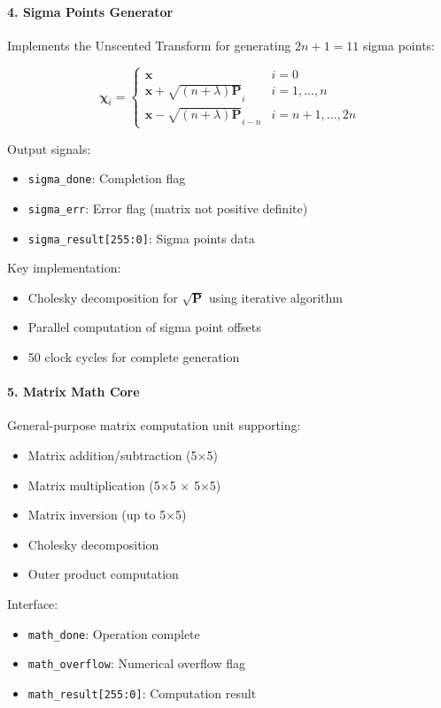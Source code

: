\documentclass[12pt,a4paper]{report}
\begin{document}
\paragraph{4. Sigma Points Generator}
Implements the Unscented Transform for generating $2n+1 = 11$ sigma points:

\begin{equation}
\boldsymbol{\chi}_i = \begin{cases}
\mathbf{x} & i = 0 \\
\mathbf{x} + \sqrt{(n+\lambda)\mathbf{P}}_i & i = 1,\ldots,n \\
\mathbf{x} - \sqrt{(n+\lambda)\mathbf{P}}_{i-n} & i = n+1,\ldots,2n
\end{cases}
\end{equation}

Output signals:
\begin{itemize}
    \item \texttt{sigma\_done}: Completion flag
    \item \texttt{sigma\_err}: Error flag (matrix not positive definite)
    \item \texttt{sigma\_result[255:0]}: Sigma points data
\end{itemize}

Key implementation:
\begin{itemize}
    \item Cholesky decomposition for $\sqrt{\mathbf{P}}$ using iterative algorithm
    \item Parallel computation of sigma point offsets
    \item 50 clock cycles for complete generation
\end{itemize}

\paragraph{5. Matrix Math Core}
General-purpose matrix computation unit supporting:
\begin{itemize}
    \item Matrix addition/subtraction (5×5)
    \item Matrix multiplication (5×5 × 5×5)
    \item Matrix inversion (up to 5×5)
    \item Cholesky decomposition
    \item Outer product computation
\end{itemize}

Interface:
\begin{itemize}
    \item \texttt{math\_done}: Operation complete
    \item \texttt{math\_overflow}: Numerical overflow flag
    \item \texttt{math\_result[255:0]}: Computation result
\end{itemize}
\end{document}
